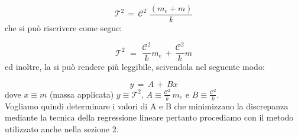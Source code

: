 \begin{equation*}
	\mathcal{T}^2 \,=\, \mathcal{C}^2 \,\, \frac{(m_e + m)}{k}
\end{equation*}
%
che si può riscrivere come segue:

\begin{equation}
	\mathcal{T}^2 \,\,=\,\, \frac{\mathcal{C}^2}{k} m_e \,+\, \frac{\mathcal{C}^2}{k} m
	\label{eq:mCspezzati}
\end{equation}
%
ed inoltre, la si può rendere più leggibile, scivendola nel seguente modo:

\begin{equation}
	y \,=\, A \,+\, Bx
	\label{eq:pppar}
\end{equation}
%
dove $x \equiv m$ (massa applicata) $y \equiv \mathcal{T}^2$, $A \equiv \frac{\mathcal{C}^2}{k} \, m_e$ e $B \equiv \frac{\mathcal{C}^2}{k}$.\\
Vogliamo quindi determinare i valori di A e B che minimizzano la discrepanza mediante la tecnica della regressione lineare pertanto procediamo con il metodo utilizzato anche nella sezione 2.

